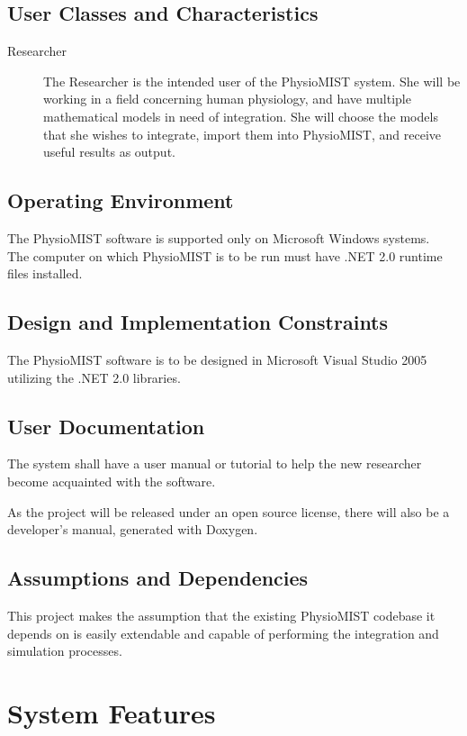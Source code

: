 \documentclass{article}
\begin{document}
\subsection{User Classes and Characteristics}
\begin{description}
\item[Researcher]
The Researcher is the intended user of the PhysioMIST system. She will be working in a field concerning human physiology, and have multiple mathematical models in need of integration. She will choose the models that she wishes to integrate, import them into PhysioMIST, and receive useful results as output.
\end{description}

\subsection{Operating Environment}
The PhysioMIST software is supported only on Microsoft Windows systems. \\
The computer on which PhysioMIST is to be run must have .NET 2.0 runtime files installed. \\

\subsection{Design and Implementation Constraints}
The PhysioMIST software is to be designed in Microsoft Visual Studio 2005 utilizing the .NET 2.0 libraries.

\subsection{User Documentation}
The system shall have a user manual or tutorial to help the new researcher become acquainted with the software.

As the project will be released under an open source license, there will also be a developer's manual, generated with Doxygen.

\subsection{Assumptions and Dependencies}
This project makes the assumption that the existing PhysioMIST codebase it depends on is easily extendable and capable of performing the integration and simulation processes.


\section{System Features}
\end{document}
